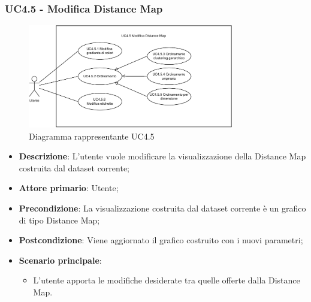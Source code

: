 \newpage
\subsubsection{UC4.5 - Modifica Distance Map}
\label{ssub:uc4.5}
\begin{figure}[h]
    \centering
    \includegraphics[width=0.8\textwidth]{componenti/casi-duso/diagrammi/UC4_5.pdf}
    \caption{Diagramma rappresentante UC4.5}
    \label{fig:UC4.5}
\end{figure}

\begin{itemize}
    \item \textbf{Descrizione}: L'utente vuole modificare la visualizzazione della Distance Map costruita dal dataset corrente;
    \item \textbf{Attore primario}: Utente;
    \item \textbf{Precondizione}: La visualizzazione costruita dal dataset corrente è un grafico di tipo Distance Map;
    \item \textbf{Postcondizione}: Viene aggiornato il grafico costruito con i nuovi parametri;
    \item \textbf{Scenario principale}:
    \begin{itemize}
        \item L'utente apporta le modifiche desiderate tra quelle offerte dalla Distance Map.
    \end{itemize}
\end{itemize}

